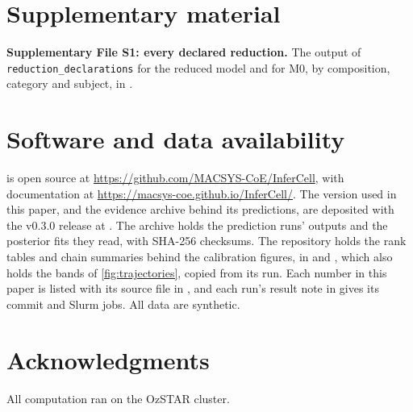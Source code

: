 \section*{Supplementary material}

\textbf{Supplementary File S1: every declared reduction.} The output of \texttt{reduction\_declarations} for the
reduced model and for M0, by composition, category and subject, in
.

\section*{Software and data availability}
\label{sec:availability}

\IC{} is open source at \url{https://github.com/MACSYS-CoE/InferCell}, with
documentation at \url{https://macsys-coe.github.io/InferCell/}. The version used in this paper, and the evidence archive behind
its predictions, are deposited with the v0.3.0 release at . The archive holds the prediction runs' outputs and the posterior fits they read, with SHA-256 checksums. The repository holds the rank tables and chain summaries behind the calibration figures, in  and , which also holds the bands of \cref{fig:trajectories}, copied from its run. Each number in this paper is listed with its source file in
, and each run's result note in  gives its
commit and Slurm jobs. All data are synthetic.

\section*{Acknowledgments}
All computation ran on the OzSTAR cluster. 
